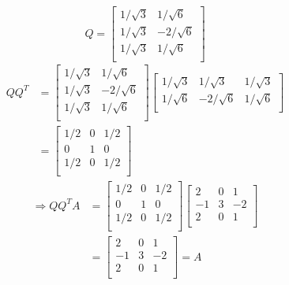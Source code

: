 \begin{equation*}
    Q =
    \begin{bmatrix}
    1/\sqrt{3}&1/ \sqrt{6} \\
    1/\sqrt{3}&-2/\sqrt{6} \\
    1/\sqrt{3}&1/ \sqrt{6} \\
    \end{bmatrix}
\end{equation*}
\begin{align*}
    QQ^T &=
    \begin{bmatrix}
    1/\sqrt{3}&1/ \sqrt{6} \\
    1/\sqrt{3}&-2/\sqrt{6} \\
    1/\sqrt{3}&1/ \sqrt{6} \\
    \end{bmatrix}
    \begin{bmatrix}
    1/\sqrt{3} & 1/\sqrt{3} & 1/\sqrt{3} \\
    1/ \sqrt{6} &-2/\sqrt{6} &1/ \sqrt{6} \\
    \end{bmatrix}\\
    &=
    \begin{bmatrix}
        1/2 & 0 & 1/2 \\
        0 & 1 & 0 \\
        1/2 & 0 & 1/2 \\
    \end{bmatrix}
\end{align*}
\begin{align*}
    \Rightarrow QQ^TA &=
    \begin{bmatrix}
        1/2 & 0 & 1/2 \\
        0 & 1 & 0 \\
        1/2 & 0 & 1/2 \\
    \end{bmatrix}
\begin{bmatrix}
    2 & 0 & 1 \\
    -1 & 3 & -2 \\
    2 & 0 & 1 \\
\end{bmatrix}\\
&=
\begin{bmatrix}
    2 & 0 & 1 \\
    -1 & 3 & -2 \\
    2 & 0 & 1 \\
\end{bmatrix} = A
\end{align*}

